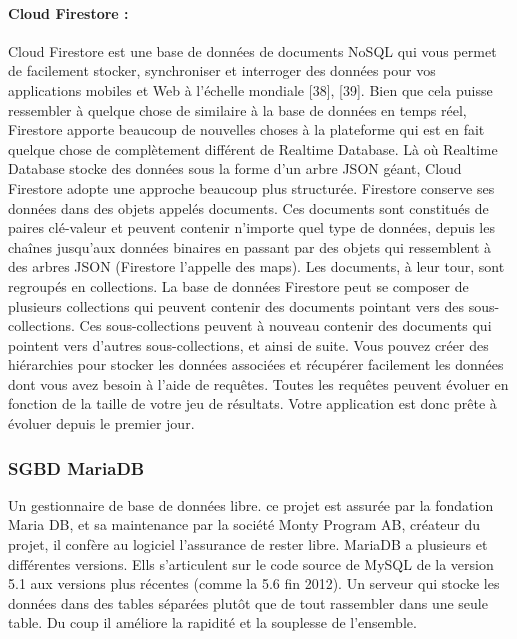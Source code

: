 \paragraph{Cloud Firestore :\newline}
Cloud Firestore est une base de données de documents NoSQL qui vous permet de facilement
stocker, synchroniser et interroger des données pour vos applications mobiles et Web à l'échelle
mondiale [38], [39]. Bien que cela puisse ressembler à quelque chose de similaire à la base de
données en temps réel, Firestore apporte beaucoup de nouvelles choses à la plateforme qui est
en fait quelque chose de complètement différent de Realtime Database.
Là où Realtime Database stocke des données sous la forme d'un arbre JSON géant, Cloud
Firestore adopte une approche beaucoup plus structurée. Firestore conserve ses données dans des objets appelés documents. Ces documents sont constitués de paires clé-valeur et peuvent
contenir n'importe quel type de données, depuis les chaînes jusqu'aux données binaires en
passant par des objets qui ressemblent à des arbres JSON (Firestore l'appelle des maps). Les
documents, à leur tour, sont regroupés en collections.
La base de données Firestore peut se composer de plusieurs collections qui peuvent contenir
des documents pointant vers des sous-collections. Ces sous-collections peuvent à nouveau
contenir des documents qui pointent vers d'autres sous-collections, et ainsi de suite.
Vous pouvez créer des hiérarchies pour stocker les données associées et récupérer facilement
les données dont vous avez besoin à l'aide de requêtes. Toutes les requêtes peuvent évoluer en
fonction de la taille de votre jeu de résultats. Votre application est donc prête à évoluer depuis
le premier jour.
\subsubsection{SGBD MariaDB}
Un gestionnaire de base de données libre.
ce projet est assurée par la fondation Maria DB, et sa
maintenance par la société Monty Program AB, créateur du
projet, il confère au logiciel l'assurance de rester libre. MariaDB a
plusieurs et différentes versions. Ells s'articulent sur le code
source de MySQL de la version 5.1 aux versions plus récentes
(comme la 5.6 fin 2012). Un serveur qui stocke les données dans
des tables séparées plutôt que de tout rassembler dans une seule
table. Du coup il améliore la rapidité et la souplesse de
l'ensemble.

